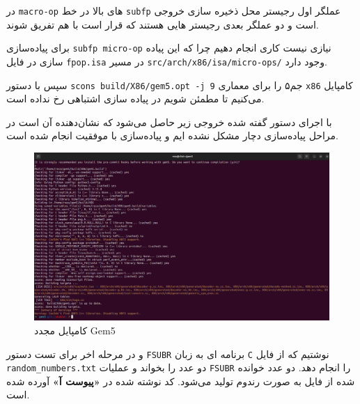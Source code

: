 \documentclass[12pt]{exam}
\begin{document}
\begin{multicols}{1}
در \texttt{macro-op} های بالا در خط \texttt{subfp} عملگر اول رجیستر محل ذخیره سازی خروجی است و دو عملگر بعدی رجیستر هایی هستند که قرار است با هم تفریق شوند.

برای پیاده‌سازی \texttt{subfp micro-op} نیازی نیست کاری انجام دهیم چرا که این پیاده سازی در فایل \texttt{fpop.isa} در مسیر \texttt{src/arch/x86/isa/micro-ops/} وجود دارد.

سپس با دستور \texttt{scons build/X86/gem5.opt -j 9} جم‌۵ را برای معماری \texttt{x86} کامپایل می‌کنیم تا مطمئن شویم در پیاده سازی اشتباهی رخ نداده است.

با اجرای دستور گفته شده خروجی زیر حاصل می‌شود که نشان‌دهنده آن است در مراحل پیاده‌سازی دچار مشکل نشده ایم و پیاده‌سازی با موفقیت انجام شده است.
\begin{center}
	\begin{figure}[H]
		\includegraphics[scale=0.13]{images/img2.png}
		\caption{کامپایل مجدد Gem5}
		\label{کامپایل جم‌۵}
	\end{figure}
\end{center}

و در مرحله اخر برای تست دستور \texttt{FSUBR} برنامه ای به زبان \texttt{C} نوشتیم که از فایل \texttt{random\_numbers.txt} دو عدد را بخواند و عملیات \texttt{FSUBR} را انجام دهد. دو عدد خوانده شده از فایل به صورت رندوم تولید می‌شود. کد نوشته شده در \textbf{«پیوست آ»} آورده شده است.


\end{multicols}
\end{document}
